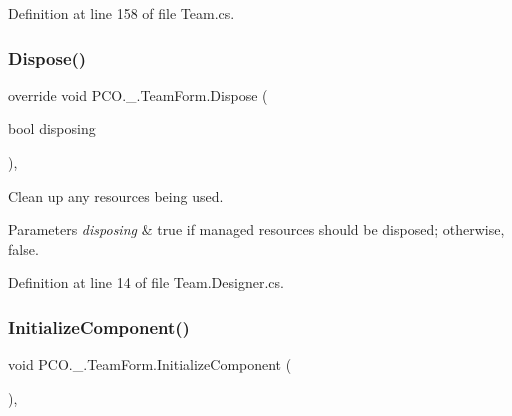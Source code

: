 Definition at line 158 of file Team.\+cs.

\mbox{\label{classPCO_1_1__0_1_1TeamForm_a5449a007da7a31beca89946d925d0b69}} 
\subsubsection{\texorpdfstring{Dispose()}{Dispose()}}
{\footnotesize\ttfamily override void P\+C\+O.\+\_.\+Team\+Form.\+Dispose (\begin{DoxyParamCaption}\item[{bool}]{disposing }\end{DoxyParamCaption})\hspace{0.3cm}{\ttfamily [inline]}, {\ttfamily [protected]}}



Clean up any resources being used. 


\begin{DoxyParams}{Parameters}
{\em disposing} & true if managed resources should be disposed; otherwise, false.\\
\hline
\end{DoxyParams}


Definition at line 14 of file Team.\+Designer.\+cs.

\mbox{\label{classPCO_1_1__0_1_1TeamForm_a2f95204581542deb466d2c1643aea9d3}} 
\subsubsection{\texorpdfstring{Initialize\+Component()}{InitializeComponent()}}
{\footnotesize\ttfamily void P\+C\+O.\+\_.\+Team\+Form.\+Initialize\+Component (\begin{DoxyParamCaption}{ }\end{DoxyParamCaption})\hspace{0.3cm}{\ttfamily [inline]}, {\ttfamily [private]}}



